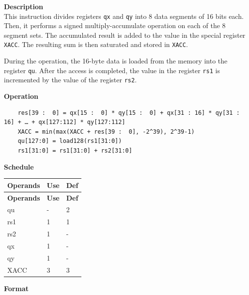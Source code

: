 \textbf{Description}\\
This instruction divides registers \lstinline{qx} and \lstinline{qy} into 8 data segments of 16 bits each. Then, it performs a signed multiply-accumulate operation on each of the 8 segment sets. The accumulated result is added to the value in the special register \lstinline{XACC}. The resulting sum is then saturated and stored in \lstinline{XACC}.

During the operation, the 16-byte data is loaded from the memory into the register \lstinline{qu}. After the access is completed, the value in the register \lstinline{rs1} is incremented by the value of the register \lstinline{rs2}.

\textbf{Operation}\\
\begin{lstlisting}
    res[39 :  0] = qx[15 :  0] * qy[15 :  0] + qx[31 : 16] * qy[31 : 16] + … + qx[127:112] * qy[127:112]
    XACC = min(max(XACC + res[39 :  0], -2^39), 2^39-1)
    qu[127:0] = load128(rs1[31:0])
    rs1[31:0] = rs1[31:0] + rs2[31:0]
\end{lstlisting}

\textbf{Schedule}\\
\begin{longtable}[c]{|l|l|l|}
    \hline
    \rowcolor{lightgray}
    \textbf{Operands} & \textbf{Use} & \textbf{Def} \\\hline
    \endfirsthead
    \hline
    \rowcolor{lightgray}
     \textbf{Operands} & \textbf{Use} & \textbf{Def} \\\hline
    \endhead
    \hline
    \endfoot

    qu & - & 2 \\\hline
    rs1 & 1 & 1 \\\hline
    rs2 & 1 & - \\\hline
     qx & 1 & - \\\hline
     qy & 1 & - \\\hline
     XACC & 3 & 3
\end{longtable}

\textbf{Format}\\

